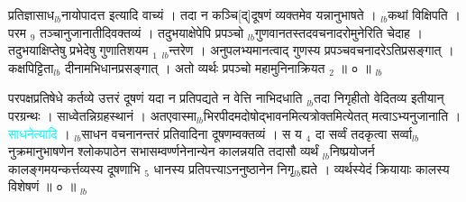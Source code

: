 \documentclass[article,12pt,a4paper]{memoir}%
\newcommand{\quotelemma}[1]{\textcolor{cyan}{#1}}
\newcounter{parCount}
\begin{document}
प्रतिज्ञासाध{\tiny $_{lb}$}नायोपादत्त इत्यादि वाच्यं । तदा न कञ्चि[द्]दूषणं व्यक्तमेव यन्नानुभाषते । {\tiny $_{lb}$}कथां विक्षिपति । परम {\tiny $_{9}$} \leavevmode{} तञ्चानुजानातीदिवक्तव्यं । तदुभयाक्षेपेपि प्रपञ्चो {\tiny $_{lb}$}गुणवानतस्तदवचनादरोमुनेरिति चेदाह । तदुभयाक्षिप्तेषु प्रभेदेषु गुणातिशयम {\tiny $_{1}$} {\tiny $_{lb}$}न्तरेण । अनुपलभ्यमानत्वाद् गुणस्य प्रपञ्चवचनादरेऽतिप्रसङ्गात् । कक्षपिट्टिता{\tiny $_{lb}$} \leavevmode{} दीनामभिधानप्रसङ्गात् । अतो व्यर्थः प्रपञ्चो महामुनिनाक्रियत {\tiny $_{2}$} ॥ ० ॥
	{}
	\pend%
      {\tiny $_{lb}$}

	  
	  \pstart \leavevmode%
	परपक्षप्रतिषेधे कर्तव्ये उत्तरं दूषणं यदा न प्रतिपद्यते न वेत्ति नाभिदधाति {\tiny $_{lb}$}तदा निगृहीतो वेदितव्य इतीयान् परग्रन्थः । साध्वेतन्निग्रहस्थानं । अतएवास्मा{\tiny $_{lb}$}भिरपीदमदोषोद्भावनमित्यत्रोक्तमित्येतत् मत्वाऽभ्यनुजानाति । \quotelemma{साधनेत्यादि} । {\tiny $_{lb}$}साधन वचनानन्तरं प्रतिवादिना दूषणम्वक्तव्यं । स य {\tiny $_{4}$} दा सर्व्वं तदकृत्वा सर्व्वा{\tiny $_{lb}$}नुक्रमानुभाषणेन श्लोकपाठेन सभासम्वर्ण्णनेनान्येन कालन्नयति तदासौ व्यर्थं {\tiny $_{lb}$}निष्प्रयोजर्न कालङ्गमयन्कर्त्तव्यस्य दूषणाभि {\tiny $_{5}$} धानस्य प्रतिपत्त्याऽननुष्ठानेन निगृ{\tiny $_{lb}$}ह्यते । व्यर्थस्येदं क्रियायाः कालस्य विशेषणं ॥ ० ॥
	{}
	\pend%
      {\tiny $_{lb}$}
\end{document}
